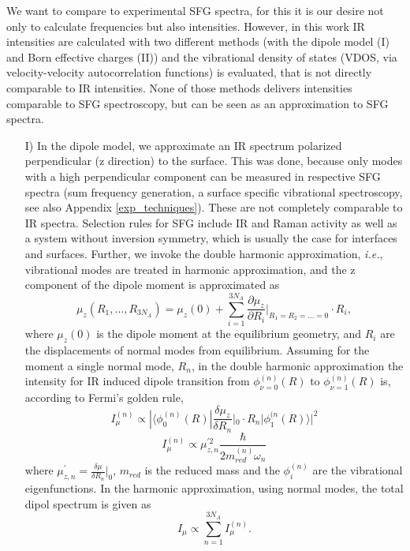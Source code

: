 \documentclass[11pt,DIV=13,BCOR=5mm,a4paper,headinclude]{scrbook}
\begin{document}
We want to compare to experimental SFG spectra, for this it is our desire not only to calculate frequencies but also intensities.
However, in this work IR intensities are calculated with two different methods (with the dipole model (I) and Born effective charges (II)) and the vibrational density of states (VDOS, via velocity-velocity autocorrelation functions) is evaluated, that is not directly comparable to IR intensities.
None of those methods delivers intensities comparable to SFG spectroscopy, but can be seen as an approximation to SFG spectra.


\begin{itemize}
 \item[I)]
 In the dipole model, we approximate an IR spectrum polarized perpendicular (z direction) to the surface.
This was done, because only modes with a high perpendicular component can be measured in respective SFG spectra (sum frequency generation, a surface specific vibrational spectroscopy, see also Appendix \ref{exp_techniques}).
These are not completely comparable to IR spectra.
Selection rules for SFG include IR and Raman activity as well as a system without inversion symmetry, which is usually the case for interfaces and surfaces.
 Further, we invoke the double harmonic approximation, \textit{i.e.}, vibrational modes are treated in harmonic approximation, and the z component of the dipole moment is approximated as
 \begin{equation}
  \mu_z(R_1,...,R_{3N_A})=\mu_z(0) + \sum_{i=1}^{3N_A}\frac{\partial \mu_z}{\partial R_i}|_{R_1=R_2=...=0}\cdot R_i ,
 \end{equation}
 where $\mu_z(0)$ is the dipole moment at the equilibrium geometry, and $R_i$ are the displacements of normal modes from equilibrium.
Assuming for the moment a single normal mode, $R_n$, in the double harmonic approximation the intensity for IR induced dipole transition from $\phi_{\nu=0}^{(n)}(R)$ to $\phi_{\nu=1}^{(n)}(R)$ is, according to Fermi's golden rule,
\begin{equation}
I_\mu^{(n)}\propto |\langle \phi_0^{(n)}(R)|\frac{\delta \mu_z}{\delta R_n}|_0\cdot R_n|\phi_1^{(n}(R) \rangle|^2
\end{equation}
\begin{equation}\label{eq:mu-int}
I_\mu^{(n)}\propto \mu_{z,n}^{\prime 2} \frac{\hbar}{2m_{red}^{(n)}\omega_n}
\end{equation}
where $\mu_{z,n}^{\prime}=\frac{\delta \mu}{\delta R_n}|_0$, $m_{red}$ is the reduced mass and the $\phi_i^{(n)}$ are the vibrational eigenfunctions.
In the harmonic approximation, using normal modes, the total dipol spectrum is given as 
\begin{equation}
I_\mu \propto \sum_{n=1}^{3N_A}I_{\mu}^{(n)}.
\end{equation}



\end{itemize}
\end{document}
